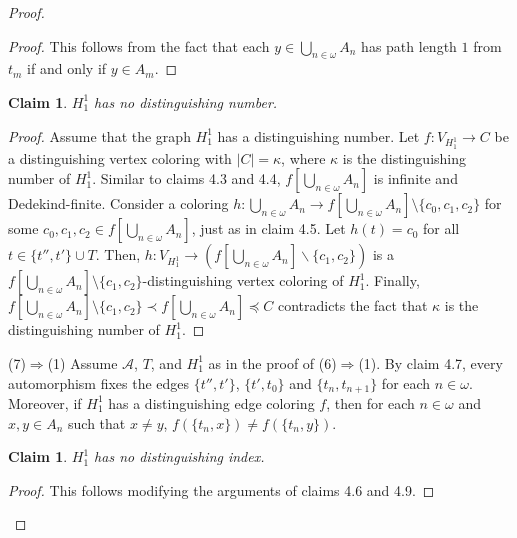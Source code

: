 \documentclass[12pt,reqno,a4paper]{amsart}
\theoremstyle{definition}
\newtheorem{claim}[defn]{Claim}
\begin{document}
\begin{proof}
		\begin{proof}
			This follows from the fact that each $y\in \bigcup_{n\in\omega}A_n$ has path length $1$ from $t_{m}$ if and only if $y\in A_m$.       
		\end{proof}
		
		\begin{claim}
			{\em $H_1^1$ has no distinguishing number.}
		\end{claim}
		\begin{proof}
			Assume that the graph $H_{1}^{1}$ has a distinguishing number. Let  $f: V_{H_1^1} \to C$ be a distinguishing vertex coloring with $|C|=\kappa$, where $\kappa$ is the distinguishing number of $H_1^1$. Similar to claims 4.3 and 4.4, $f[\bigcup_{n\in \omega}A_n]$ is infinite and Dedekind-finite. Consider a coloring $h: \bigcup_{n\in \omega}A_n\to f[\bigcup_{n\in \omega}A_n]\setminus\{c_0,c_{1},c_{2}\}$ for some $c_{0}, c_{1}, c_{2}\in f[\bigcup_{n\in \omega}A_{n}]$, just as in claim 4.5. Let $h(t)=c_{0}$ for all $t\in \{t'',t'\}\cup T$. Then, $h: V_{H^1_{1}} \rightarrow (f[\bigcup_{n\in \omega}A_{n}]\backslash \{c_{1},c_{2}\})$ is a $f[\bigcup_{n\in \omega}A_n]\setminus\{c_1,c_{2}\}$-distinguishing vertex coloring of $H^1_{1}$. 
			Finally, 
			$f[\bigcup_{n\in \omega}A_n]\setminus\{c_1,c_{2}\} \prec  f[\bigcup_{n\in\omega} A_{n}] \preceq C$
			contradicts the fact that $\kappa$ is the distinguishing number of $H_1^1$.
		\end{proof}
		
		(7)$\Rightarrow$(1) Assume $\mathcal{A}$, $T$, and $H^1_1$ as in the proof of (6)$\Rightarrow$(1). By claim 4.7, every automorphism fixes the edges $\{t'',t'\}$, $\{t', t_0\}$ and $\{t_n, t_{n+1}\}$ for each $n\in \omega$. 
		Moreover, if $H_1^1$ has a distinguishing edge coloring $f$, then for each $n\in \omega$ and $x,y\in A_n$ such that $x\neq y$, $f(\{t_n, x\})\neq f(\{t_n, y\})$.
		
		\begin{claim}
			{\em $H_1^1$ has no distinguishing index.}
		\end{claim}
		\begin{proof}
			This follows modifying the arguments of claims 4.6 and 4.9.     
		\end{proof}
	\end{proof}
	
\end{document}
